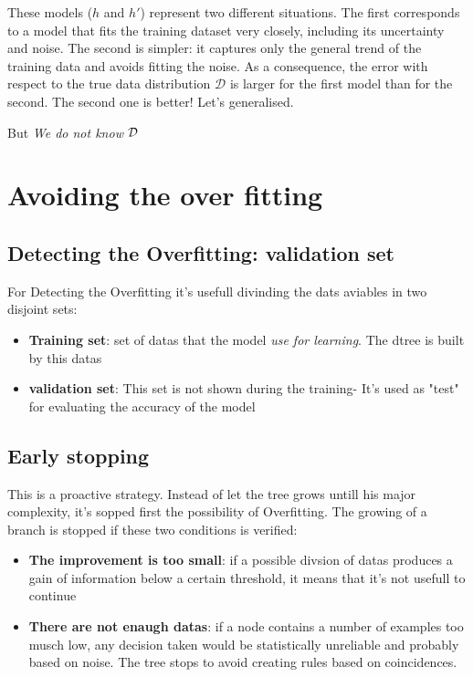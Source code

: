 
These models ($h$ and $h'$) represent two different situations.
The first corresponds to a model that fits the training dataset very closely, including its uncertainty and noise.
The second is simpler: it captures only the general trend of the training data and avoids fitting the noise.
As a consequence, the error with respect to the true data distribution $\mathcal{D}$ is larger for the first model than for the second.
The second one is better! Let's generalised.

But \textit{We do not know} $\mathcal{D}$

\section{Avoiding the over fitting}
\subsection{Detecting the Overfitting: validation set}
For Detecting the Overfitting it's usefull divinding the dats aviables in two disjoint sets:
\begin{itemize}
    \item \textbf{Training set}: set of datas that the model \textit{use for learning}. The dtree is built by this datas
    \item \textbf{validation set}: This set is not shown during the training- It's used as "test" for evaluating the accuracy of the model
\end{itemize}

\subsection{Early stopping}
This is a proactive strategy. Instead of let the tree grows untill his major complexity, it's sopped first the possibility of Overfitting. The growing of a branch is stopped if these two conditions is verified:
\begin{itemize}
    \item \textbf{The improvement is too small}: if a possible divsion of datas produces a gain of information below a certain threshold, it means that it's not usefull to continue
    \item \textbf{There are not enaugh datas}: if a node contains a number of examples too musch low, any decision taken would be statistically unreliable and probably based on noise. The tree stops to avoid creating rules based on coincidences.
\end{itemize}
